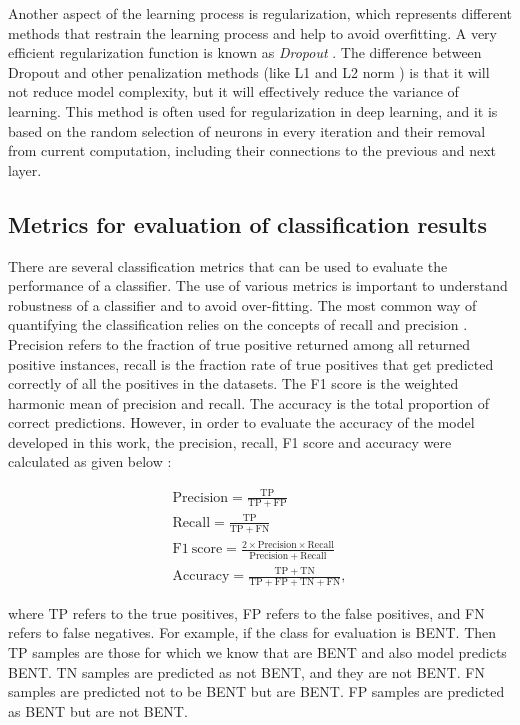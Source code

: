 \documentclass[fleqn,usenatbib]{mnras}
\begin{document}
Another aspect of the learning process is regularization, which represents different methods that restrain the learning process and help to avoid overfitting. A very efficient regularization function is  known  as \textit{Dropout} \citep{dropout}. The difference between Dropout and other penalization methods (like L1 and L2 norm \citep{ng2004feature}) is that it will not reduce model complexity, but it will effectively reduce the variance of learning. This method is often used for regularization in deep learning, and it is based on the random selection of neurons in every iteration and their removal from current computation, including their connections to the previous and next layer.
\subsection{Metrics for evaluation of classification results}
There are several classification metrics that can be used to evaluate the performance of a classifier. The use of various metrics is important to understand robustness of a classifier and to avoid over-fitting. The most common way of quantifying the classification relies on the concepts of recall and precision \citep{Ivezic2014}. Precision refers to the fraction of true positive returned among all returned positive instances, recall is the fraction rate of true positives that get predicted correctly of all the positives in the datasets. The F1 score is the weighted harmonic mean of precision and recall. The accuracy is the total proportion of correct predictions. However, in order to evaluate the accuracy of the model developed in this work, the  precision, recall, F1 score and accuracy  were calculated as given below :

\begin{eqnarray}
\label{eq:x}
\mathrm{Precision} = \frac{\mathrm{TP}}{\mathrm{TP+FP}} \\
\mathrm{Recall} = \frac{\mathrm{TP}}{\mathrm{TP+FN}} \\
\mathrm{F1\ score} = \frac{2 \times \mathrm{Precision}\times \mathrm{Recall}}{\mathrm{Precision+ Recall}} \\ 
\label{eq:x2}
\mathrm{Accuracy} = \frac{\mathrm{TP}+\mathrm{TN}}{\mathrm{TP+FP+TN+FN}} ,
\end{eqnarray}


 \noindent where TP refers to the true positives, FP refers to the false positives, and FN refers to false negatives.  For example, if the class for evaluation is BENT. Then TP samples are those for which we know that are BENT and also model predicts BENT. TN samples are predicted as not BENT, and they are not BENT. FN  samples are predicted not to be BENT but are BENT. FP  samples are predicted as BENT but are not BENT.
 
\end{document}
